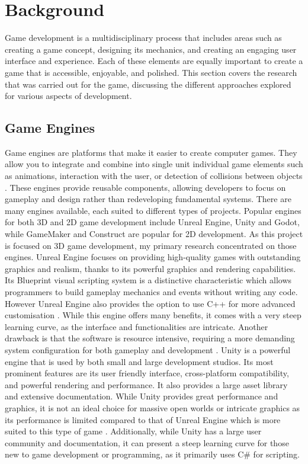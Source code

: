 \documentclass[10pt]{final_report}
\begin{document}
\chapter{Background}
Game development is a multidisciplinary process that includes areas such as creating a game concept, designing its mechanics, and creating an engaging user interface and experience. Each of these elements are equally important to create a game that is accessible, enjoyable, and polished. This section covers the research that was carried out for the game, discussing the different approaches explored for various aspects of development. 


\section{Game Engines}
Game engines are platforms that make it easier to create computer games. They allow you to integrate and combine into single unit individual game elements such as animations, interaction with the user, or detection of collisions between objects \cite{Barczak2019}. These engines provide reusable components, allowing developers to focus on gameplay and design rather than redeveloping fundamental systems. There are many engines available, each suited to different types of projects. Popular engines for both 3D and 2D game development include Unreal Engine, Unity and Godot, while GameMaker and Construct are popular for 2D development. As this project is focused on 3D game development, my primary research concentrated on those engines.
\newline
Unreal Engine focuses on providing high-quality games with outstanding graphics and realism, thanks to its powerful graphics and rendering capabilities. Its Blueprint visual scripting system is a distinctive characteristic which allows programmers to build gameplay mechanics and events without writing any code. However Unreal Engine also provides the option to use C++ for more advanced customisation \cite{eventyr_2023}. While this engine offers many benefits, it comes with a very steep learning curve, as the interface and functionalities are intricate. Another drawback is that the software is resource intensive, requiring a more demanding system configuration for both gameplay and development \cite{eventyr_2023}. 
\newline
Unity is a powerful engine that is used by both small and large development studios. Its most prominent features are its user friendly interface, cross-platform compatibility, and powerful rendering and performance. It also provides a large asset library and extensive documentation. While Unity provides great performance and graphics, it is not an ideal choice for massive open worlds or intricate graphics as its performance is limited compared to that of Unreal Engine which is more suited to this type of game \cite{medium_2024}. Additionally, while Unity has a large user community and documentation, it can present a steep learning curve for those new to game development or programming, as it primarily uses C\# for scripting.
\end{document}
